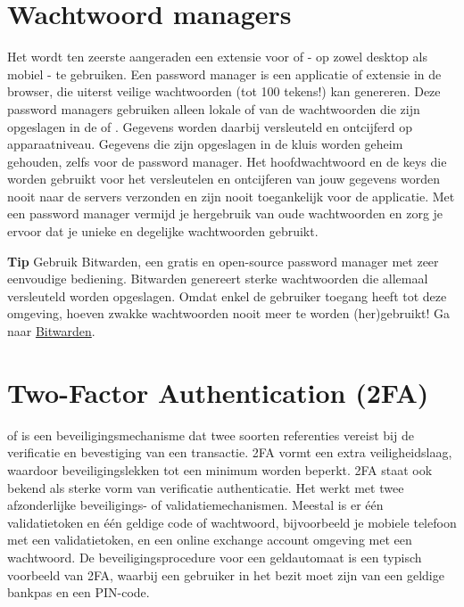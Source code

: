 \section{Wachtwoord managers}
Het wordt ten zeerste aangeraden een extensie voor  of  - op zowel desktop als mobiel - te gebruiken. Een password manager is een applicatie of extensie in de browser, die uiterst veilige wachtwoorden (tot 100 tekens!) kan genereren. Deze password managers gebruiken alleen lokale  of  van de wachtwoorden die zijn opgeslagen in de  of . Gegevens worden daarbij versleuteld en ontcijferd op apparaatniveau. Gegevens die zijn opgeslagen in de kluis worden geheim gehouden, zelfs voor de password manager. Het hoofdwachtwoord en de keys die worden gebruikt voor het versleutelen en ontcijferen van jouw gegevens worden nooit naar de servers verzonden en zijn nooit toegankelijk voor de applicatie. Met een password manager vermijd je hergebruik van oude wachtwoorden en zorg je ervoor dat je unieke en degelijke wachtwoorden gebruikt.\medskip

\begin{tipbox}{\textbf{Tip}}
    Gebruik Bitwarden, een gratis en open-source password manager met zeer eenvoudige bediening. Bitwarden genereert sterke wachtwoorden die allemaal versleuteld worden opgeslagen. Omdat enkel de gebruiker toegang heeft tot deze omgeving, hoeven zwakke wachtwoorden nooit meer te worden (her)gebruikt!
    \tcblower
    Ga naar \href{https://bitwarden.com/}{Bitwarden}.
\end{tipbox}

\section{Two-Factor Authentication (2FA)}
\label{sec:2FA}

 of  is een beveiligingsmechanisme dat twee soorten referenties vereist bij de verificatie en bevestiging van een transactie. 2FA vormt een extra veiligheidslaag, waardoor beveiligingslekken tot een minimum worden beperkt. 2FA staat ook bekend als sterke vorm van verificatie authenticatie. Het werkt met twee afzonderlijke beveiligings- of validatiemechanismen. Meestal is er {\'e}{\'e}n  validatietoken en {\'e}{\'e}n geldige code of wachtwoord, bijvoorbeeld je mobiele telefoon met een validatietoken, en een online exchange account omgeving met een wachtwoord. De beveiligingsprocedure voor een geldautomaat is een typisch voorbeeld van 2FA, waarbij een gebruiker in het bezit moet zijn van een geldige bankpas en een PIN-code.\medskip

